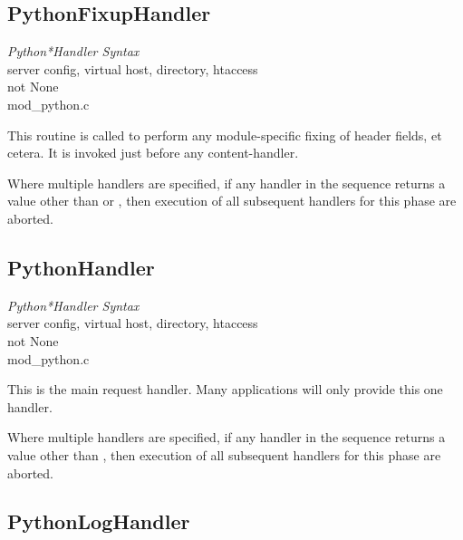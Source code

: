 \subsection{PythonFixupHandler\label{dir-handlers-fuh}}

\emph{Python*Handler Syntax}\\
server config, virtual host, directory, htaccess\\
not None\\
mod_python.c

This routine is called to perform any module-specific fixing of header
fields, et cetera. It is invoked just before any content-handler.

Where multiple handlers are specified, if any handler in the sequence
returns a value other than  or , then
execution of all subsequent handlers for this phase are aborted.

\subsection{PythonHandler\label{dir-handlers-ph}}

\emph{Python*Handler Syntax}\\
server config, virtual host, directory, htaccess\\
not None\\
mod_python.c

This is the main request handler. Many applications will only provide
this one handler.

Where multiple handlers are specified, if any handler in the sequence
returns a value other than , then execution of all
subsequent handlers for this phase are aborted.

\subsection{PythonLogHandler\label{dir-handlers-plh}}

